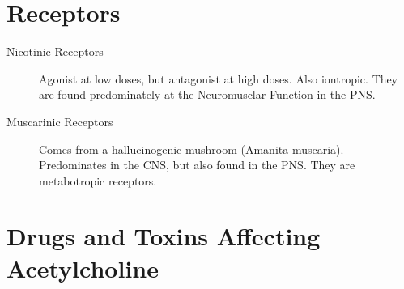 \section*{Receptors}
\begin{description}
    \item[Nicotinic Receptors]  Agonist at low doses, but antagonist at high doses. Also iontropic. They are found predominately at the Neuromusclar Function in the PNS.
    \item[Muscarinic Receptors]  Comes from a hallucinogenic mushroom (Amanita muscaria). Predominates in the CNS, but also found in the PNS. They are metabotropic receptors.
\end{description}

\section*{Drugs and Toxins Affecting Acetylcholine}
